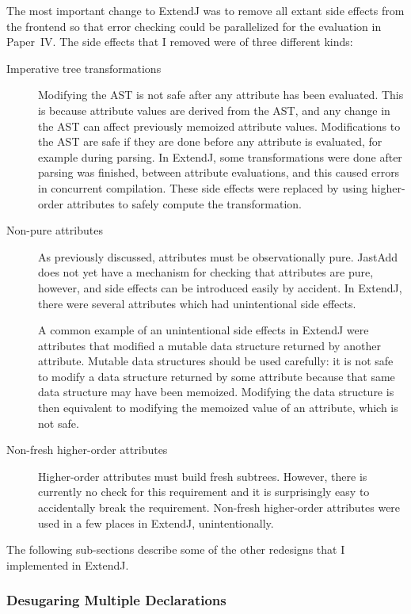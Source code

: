 \documentclass[10pt, twoside, openright]{book}
\begin{document}
The most important change to ExtendJ was to remove all extant side effects from the frontend
so that error checking could be parallelized for the evaluation in Paper~IV.
The side effects that I removed were of three different kinds:

\begin{description}
  \item[Imperative tree transformations]
    Modifying the AST is not safe after any attribute has been evaluated. This is because
    attribute values are derived from the AST, and any change in the AST can affect previously
    memoized attribute values.  Modifications to the AST are safe if they are done before any attribute
    is evaluated, for example during parsing.  In ExtendJ, some transformations were
    done after parsing was finished, between attribute evaluations, and this caused errors in
    concurrent compilation. These side effects were replaced by using higher-order attributes
    to safely compute the transformation.
  \item[Non-pure attributes]
    As previously discussed, attributes must be observationally pure. JastAdd does not yet
    have a mechanism for checking that attributes are pure, however, and side effects can be
    introduced easily by accident. In ExtendJ, there were several attributes which had
    unintentional side effects.

    A common example of an unintentional side effects in ExtendJ were attributes that modified a mutable
    data structure returned by another attribute.  Mutable data structures should be used carefully:
    it is not safe to modify a data structure returned by some attribute because that same data
    structure may have been memoized. Modifying the data structure is then equivalent to modifying
    the memoized value of an attribute, which is not safe.
  \item[Non-fresh higher-order attributes]
    Higher-order attributes must build fresh subtrees. However, there is currently no check for this
    requirement and it is surprisingly easy to accidentally break the requirement.
    Non-fresh higher-order attributes were used in a few places in ExtendJ, unintentionally.
\end{description}

The following sub-sections describe some of the other redesigns that I implemented in ExtendJ.

\subsubsection{Desugaring Multiple Declarations}
\end{document}
